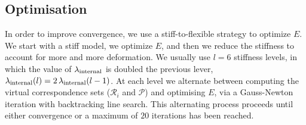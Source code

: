 \subsection{Optimisation}
In order to improve convergence, we use a stiff-to-flexible strategy to optimize $E$. We start with a stiff model, we optimize $E$, and then we reduce the stiffness to account for more and more deformation.
We usually use $l=6$ stiffness levels, in which the value of $\lambda_{\text{internal}}$ is doubled \wrt the previous lever, \ie $\lambda_{\text{internal}}(l)=2\,\lambda_{\text{internal}}(l-1)$.
At each level we alternate between computing the virtual correspondence sets ($\mathcal{R}_i$ and $\mathcal{P}$) and optimising $E$, via a Gauss-Newton iteration with backtracking line search.
This alternating process proceeds until either convergence or a maximum of $20$ iterations has been reached.

